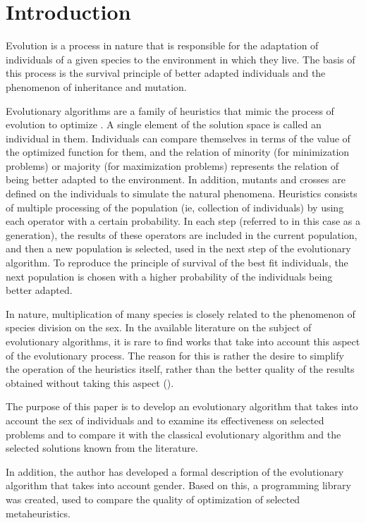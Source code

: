 \documentclass[../main.tex]{subfiles}
\begin{document}
\chapter*{Introduction}
Evolution is a process in nature that is responsible for the adaptation of individuals of a given species to the environment in which they live.
The basis of this process is the survival principle of better adapted individuals and the phenomenon of inheritance and mutation.

Evolutionary algorithms are a family of heuristics that mimic the process of evolution to optimize \cite{davis1991handbook}.
A single element of the solution space is called an individual in them.
Individuals can compare themselves in terms of the value of the optimized function for them, and the relation of minority (for minimization problems) or majority (for maximization problems) represents the relation of being better adapted to the environment.
In addition, mutants and crosses are defined on the individuals to simulate the natural phenomena.
Heuristics consists of multiple processing of the population (ie, collection of individuals) by using each operator with a certain probability.
In each step (referred to in this case as a generation), the results of these operators are included in the current population, and then a new population is selected, used in the next step of the evolutionary algorithm.
To reproduce the principle of survival of the best fit individuals, the next population is chosen with a higher probability of the individuals being better adapted.

In nature, multiplication of many species is closely related to the phenomenon of species division on the sex.
In the available literature on the subject of evolutionary algorithms, it is rare to find works that take into account this aspect of the evolutionary process.
The reason for this is rather the desire to simplify the operation of the heuristics itself, rather than the better quality of the results obtained without taking this aspect (\cite{GGA, SexualGA}).

The purpose of this paper is to develop an evolutionary algorithm that takes into account the sex of individuals and to examine its effectiveness on selected problems and to compare it with the classical evolutionary algorithm and the selected solutions known from the literature.

In addition, the author has developed a formal description of the evolutionary algorithm that takes into account gender.
Based on this, a programming library was created, used to compare the quality of optimization of selected metaheuristics.
\end{document}
